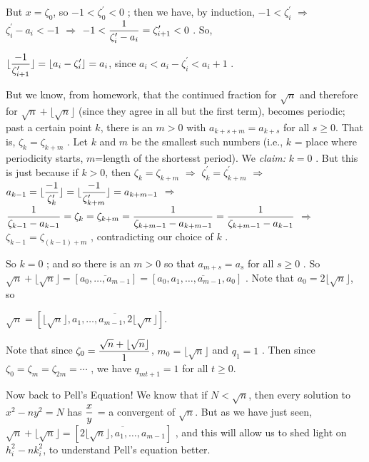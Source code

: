 But $x=\zeta_0$, so $-1<\zeta_0^\prime<0$ ; then we have, by induction, 
$-1<\zeta_i^\prime$ $\Rightarrow$ $\zeta_i^\prime - a_i < -1$ $\Rightarrow$
$\displaystyle -1<{{1}\over{\zeta_i^\prime - a_i}} = \zeta_{i+1}^\prime < 0$ . So, 

$\displaystyle \lfloor{{-1}\over{\zeta_{i+1}^\prime}}\rfloor = \lfloor a_i-\zeta_i^\prime\rfloor = a_i$, since
$a_i<a_i-\zeta_i^\prime < a_i+1$ . 

\ssk

But we know, from homework, that the continued fraction for $\sqrt{n}$ and therefore 
for $\sqrt{n}+\lfloor\sqrt{n}\rfloor$ (since they agree in all but the first term), becomes
periodic; past a certain point $k$, there is an $m> 0$ with $a_{k+s+m} = a_{k+s}$ for all $s\geq 0$.
That is, $\zeta_k = \zeta_{k+m}$ .
Let $k$ and $m$ be the smallest such numbers (i.e., $k$ = place where periodicity starts, 
$m$=length of the shortesst period). We {\it claim:} $k=0$ . But this is just because if $k>0$, then
$\zeta_k = \zeta_{k+m}$ $\Rightarrow$ $\zeta_k^\prime = \zeta_{k+m}^\prime$ $\Rightarrow$
$\displaystyle a_{k-1} = \lfloor{{-1}\over{\zeta_{k}^\prime}}\rfloor = 
\lfloor{{-1}\over{\zeta_{k+m}^\prime}}\rfloor = a_{k+m-1}$ $\Rightarrow$
$\displaystyle {{1}\over{\zeta_{k-1}-a_{k-1}}} = \zeta_k =  \zeta_{k+m} = {{1}\over{\zeta_{k+m-1}-a_{k+m-1}}}
= {{1}\over{\zeta_{k+m-1}-a_{k-1}}}$ $\Rightarrow$ $\zeta_{k-1} = \zeta_{(k-1)+m}$ , contradicting
our choice of $k$ . 

\ssk

So $k=0$ ; and so there is an $m>0$ so that $a_{m+s} = a_s$ for all $s\geq 0$ . So
$\sqrt{n}+\lfloor\sqrt{n}\rfloor = [\overline{a_0,\ldots,a_{m-1}}] = [a_0,\overline{a_1,\ldots,a_{m-1},a_0}]$ .
Note that $a_0=2\lfloor\sqrt{n}\rfloor$, so 

\ssk

$\sqrt{n} = [\lfloor\sqrt{n}\rfloor,\overline{a_1,\ldots,a_{m-1},2\lfloor\sqrt{n}\rfloor}]$.

\ssk

Note that since $\displaystyle \zeta_0={{\sqrt{n}+\lfloor\sqrt{n}\rfloor}\over{1}}$, $m_0=\lfloor\sqrt{n}\rfloor$
and $q_1=1$ . Then since $\zeta_0=\zeta_m=\zeta_{2m} = \cdots$ , we have
$q_{mt+1} = 1$ for all $t\geq 0$.


\msk

Now back to Pell's Equation! We know that if $N<\sqrt{n}$, then every solution to $x^2-ny^2=N$
has $\displaystyle {{x}\over{y}}$ = a convergent of $\sqrt{n}$. But as we have just seen,
$\sqrt{n}+\lfloor\sqrt{n}\rfloor = [\overline{2\lfloor\sqrt{n}\rfloor,a_1,\ldots,a_{m-1}}]$ , and this 
will allow us to shed light on $h_i^2-nk_i^2$, to understand Pell's equation better.

